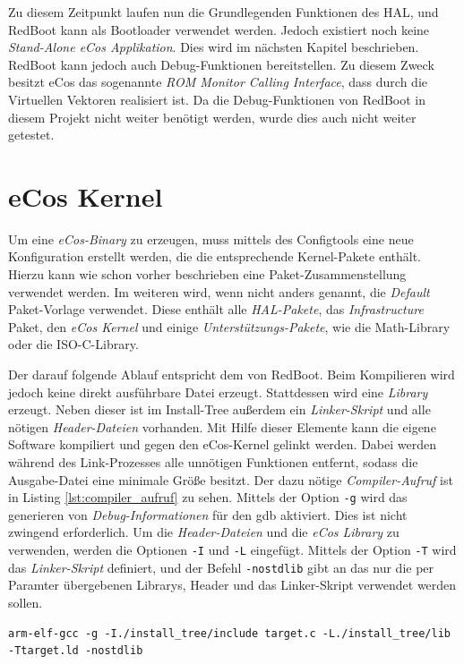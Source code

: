 \documentclass[
  a4paper,					%
  twoside,
  DIV=calc,     				%
  bibliography=totoc,
  cleardoublepage=empty,
  ngerman,     					%
  final       					%
]{scrbook}
\begin{document}
Zu diesem Zeitpunkt laufen nun die Grundlegenden Funktionen des HAL, und RedBoot kann als Bootloader verwendet werden. Jedoch existiert noch keine \emph{Stand-Alone eCos Applikation}. Dies wird im nächsten Kapitel beschrieben. RedBoot kann jedoch auch Debug-Funktionen bereitstellen. Zu diesem Zweck besitzt eCos das sogenannte \emph{ROM Monitor Calling Interface}, dass durch die Virtuellen Vektoren realisiert ist. Da die Debug-Funktionen von RedBoot in diesem Projekt nicht weiter benötigt werden, wurde dies auch nicht weiter getestet.



\section{eCos Kernel}
\label{sec:eCos_Kernel}
Um eine \emph{eCos-Binary} zu erzeugen, muss mittels des Configtools eine neue Konfiguration erstellt werden, die die entsprechende Kernel-Pakete enthält. Hierzu kann wie schon vorher beschrieben eine Paket-Zusammenstellung verwendet werden. Im weiteren wird, wenn nicht anders genannt, die \emph{Default} Paket-Vorlage verwendet. Diese enthält alle \emph{HAL-Pakete}, das \emph{Infrastructure} Paket, den \emph{eCos Kernel} und einige \emph{Unterstützungs-Pakete}, wie die Math-Library oder die ISO-C-Library.

Der darauf folgende Ablauf entspricht dem von RedBoot. Beim Kompilieren wird jedoch keine direkt ausführbare Datei erzeugt. Stattdessen wird eine \emph{Library} erzeugt. Neben dieser ist im Install-Tree außerdem ein \emph{Linker-Skript} und alle nötigen \emph{Header-Dateien} vorhanden. Mit Hilfe dieser Elemente kann die eigene Software kompiliert und gegen den eCos-Kernel gelinkt werden. Dabei werden während des Link-Prozesses alle unnötigen Funktionen entfernt, sodass die Ausgabe-Datei eine minimale Größe besitzt. Der dazu nötige \emph{Compiler-Aufruf}\cite{gcc_manual} ist in Listing \ref{lst:compiler_aufruf} zu sehen. Mittels der Option \texttt{-g} wird das generieren von \emph{Debug-Informationen} für den gdb aktiviert. Dies ist nicht zwingend erforderlich. Um die \emph{Header-Dateien} und die \emph{eCos Library} zu verwenden, werden die Optionen \texttt{-I} und \texttt{-L} eingefügt. Mittels der Option \texttt{-T} wird das \emph{Linker-Skript} definiert, und der Befehl \texttt{-nostdlib} gibt an das nur die per Paramter übergebenen Librarys, Header und das Linker-Skript verwendet werden sollen.

\begin{lstlisting}[frame=single, float, caption={Compiler-Aufruf}, label={lst:compiler_aufruf}]
arm-elf-gcc -g -I./install_tree/include target.c -L./install_tree/lib -Ttarget.ld -nostdlib
\end{lstlisting}
\end{document}
